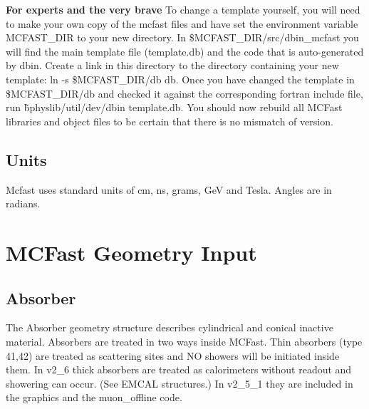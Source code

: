 {\bf For experts and the very brave}
To change a template yourself, you will need to
make your own copy of the mcfast files and have set the 
environment variable MCFAST\_DIR to your new directory.  
In \$MCFAST\_DIR/src/dbin\_mcfast you will find the main template file (template.db) and the
code that is auto-generated by dbin.  Create a link in this directory to the directory
containing your new template: ln -s \$MCFAST\_DIR/db db. 
Once you have changed the template
in \$MCFAST\_DIR/db and checked it against the corresponding fortran include file, 
run \~bphyslib/util/dev/dbin template.db.  You should now rebuild all MCFast libraries
and object files to be certain that there is no mismatch of version.     

 
\subsection{Units}

Mcfast uses standard units of cm, ns, grams, GeV and Tesla.  Angles are in radians.

\filbreak

\section{MCFast Geometry Input}

\subsection{Absorber}

The Absorber geometry structure describes cylindrical and conical inactive material.  Absorbers are treated in 
two ways inside MCFast.  Thin absorbers (type 41,42) are treated as scattering
sites and NO showers will be initiated inside them.   In v2\_6 thick absorbers are treated as
calorimeters without readout and showering can occur.  (See EMCAL structures.)  In v2\_5\_1
they are included in the graphics and the muon\_offline code.  

